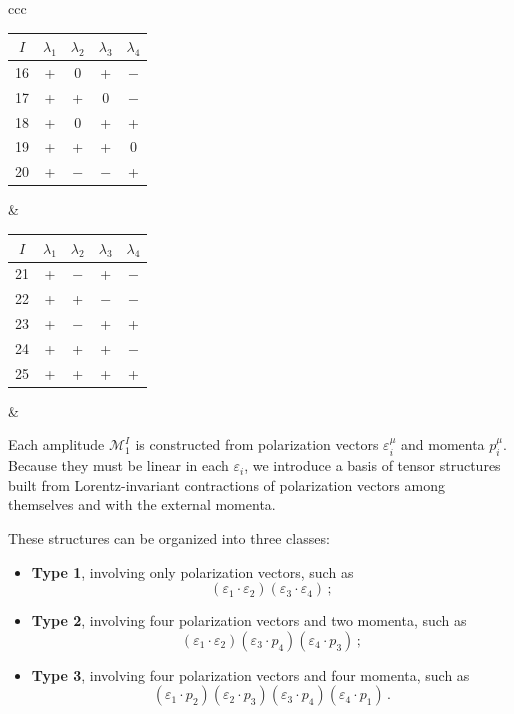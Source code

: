 \begin{table}[hbtp]
\begin{tabular}{ccc}
    \begin{tabular}{c|cccc}
    $I$ & $\lambda_1$ & $\lambda_2$ & $\lambda_3$ & $\lambda_4$ \\
    \hline
    16 & + & 0 & + & $-$ \\
    17 & + & + & 0 & $-$ \\
    18 & + & 0 & + & + \\
    19 & + & + & + & 0 \\
    20 & + & $-$ & $-$ & + \\
    \end{tabular}
    &
    \begin{tabular}{c|cccc}
    $I$ & $\lambda_1$ & $\lambda_2$ & $\lambda_3$ & $\lambda_4$ \\
    \hline
    21 & + & $-$ & + & $-$ \\
    22 & + & + & $-$ & $-$ \\
    23 & + & $-$ & + & + \\
    24 & + & + & + & $-$ \\
    25 & + & + & + & + \\
    \end{tabular}
    &
    
    \end{tabular}
    
    \end{table}
Each amplitude $\mathcal{M}_1^I$ is constructed from polarization vectors $\varepsilon_i^\mu$ and momenta $p_i^\mu$. Because they must be linear in each $\varepsilon_i$, we introduce a basis of tensor structures built from Lorentz-invariant contractions of polarization vectors among themselves and with the external momenta.

These structures can be organized into three classes:
\begin{itemize}
    \item \textbf{Type 1}, involving only polarization vectors, such as
    \[
    (\varepsilon_1 \cdot \varepsilon_2)(\varepsilon_3 \cdot \varepsilon_4)\,;
    \]
    
    \item \textbf{Type 2}, involving four polarization vectors and two momenta, such as
    \[
    (\varepsilon_1 \cdot \varepsilon_2)(\varepsilon_3 \cdot p_4)(\varepsilon_4 \cdot p_3)\,;
    \]
    
    \item \textbf{Type 3}, involving four polarization vectors and four momenta, such as
    \[
    (\varepsilon_1 \cdot p_2)(\varepsilon_2 \cdot p_3)(\varepsilon_3 \cdot p_4)(\varepsilon_4 \cdot p_1)\,.
    \]
\end{itemize}

